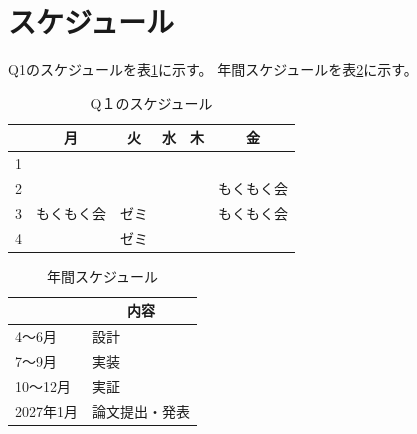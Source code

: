 \documentclass[a4paper,12pt]{ujarticle}
\newcommand{\thc}[1]{\multicolumn{1}{c|}{#1}}
\begin{document}
\section{スケジュール}\label{sec:schedule}
Q1のスケジュールを表\ref{tab:studyschedule}に示す。
年間スケジュールを表\ref{tab:yearlyschedule}に示す。

\begin{table}[H]
  \caption{Q１のスケジュール}\label{tab:studyschedule}
  \centering
  \begin{tabular}{|p{4mm}||p{30mm}|p{30mm}|p{30mm}|p{30mm}|p{30mm}|}\hline
        & \thc{月} & \thc{火} & \thc{水} & \thc{木} & \thc{金} \\ \hline\hline
     1  &     &     &     &  &   \\ \hline
     2  &     &  &  &  & もくもく会\\ \hline
     3  & もくもく会  & ゼミ &  & &もくもく会  \\ \hline
     4  &  & ゼミ & &  & \\ \hline
  \end{tabular}
\end{table}

\begin{table}[H]
  \caption{年間スケジュール}\label{tab:yearlyschedule}
  \centering
  \begin{tabular}{|p{30mm}||p{30mm}|}\hline
        & \thc{内容} \\ \hline\hline
     4～6月  & 設計 \\ \hline
     7～9月  & 実装 \\ \hline
     10～12月  & 実証 \\ \hline
     2027年1月  & 論文提出・発表 \\ \hline
  \end{tabular}
\end{table}
\end{document}
